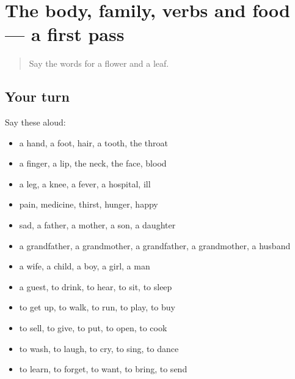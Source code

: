 \section[(dialogue)]{The body, family, verbs and food — a first pass}

\label{lesson:PA-R73-first-pass-the-body-family-verbs-and-food}



\begin{quote}
Say the words for a flower and a leaf.
\end{quote}

\subsection*{Your turn}
Say these aloud:

\begin{itemize}
\raggedright
  \item a hand, a foot, hair, a tooth, the throat
  \item a finger, a lip, the neck, the face, blood
  \item a leg, a knee, a fever, a hospital, ill
  \item pain, medicine, thirst, hunger, happy
  \item sad, a father, a mother, a son, a daughter
  \item a grandfather, a grandmother, a grandfather, a grandmother, a husband
  \item a wife, a child, a boy, a girl, a man
  \item a guest, to drink, to hear, to sit, to sleep
  \item to get up, to walk, to run, to play, to buy
  \item to sell, to give, to put, to open, to cook
  \item to wash, to laugh, to cry, to sing, to dance
  \item to learn, to forget, to want, to bring, to send
\end{itemize}

